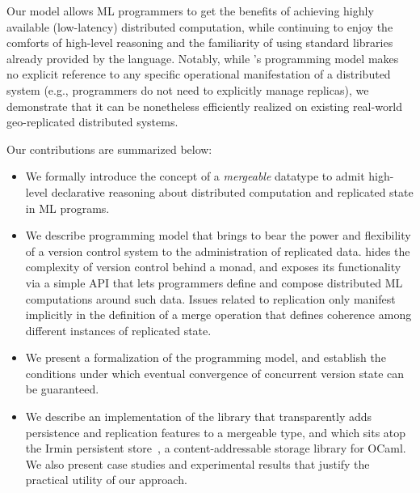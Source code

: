Our model allows ML programmers to get the benefits of achieving
highly available (low-latency) distributed computation, while
continuing to enjoy the comforts of high-level reasoning and the
familiarity of using standard libraries already provided by the
language.  Notably, while \name's programming model makes no explicit
reference to any specific operational manifestation of a distributed
system (e.g., programmers do not need to explicitly manage replicas),
we demonstrate that it can be nonetheless efficiently realized on
existing real-world geo-replicated distributed systems.

Our contributions are summarized below:

\begin{itemize}
    \item We formally introduce the concept of a \emph{mergeable}
      datatype to admit high-level declarative reasoning about
      distributed computation and replicated state in ML programs.

    \item We describe \name programming model that brings to bear the
      power and flexibility of a version control system to the
      administration of replicated data. \name hides the complexity of
      version control behind a monad, and exposes its functionality
      via a simple API that lets programmers define and compose
      distributed ML computations around such data.  Issues related to
      replication only manifest implicitly in the definition of a
      merge operation that defines coherence among different instances
      of replicated state.

    \item We present a formalization of the \name programming model,
      and establish the conditions under which eventual convergence of
      concurrent version state can be guaranteed.

    \item We describe an implementation of the \name library that
      transparently adds persistence and replication features to a
      mergeable type, and which sits atop the Irmin persistent
      store~\cite{irmin}, a content-addressable storage library for
      OCaml. We also present case studies and experimental results
      that justify the practical utility of our approach.
\end{itemize}

